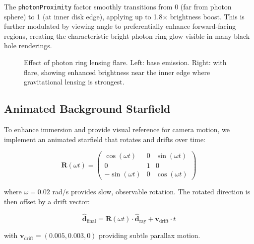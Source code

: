 \documentclass[12pt,a4paper]{article}
\theoremstyle{definition}
\theoremstyle{remark}
\begin{document}
The \texttt{photonProximity} factor smoothly transitions from 0 (far from photon sphere) to 1 (at inner disk edge), applying up to 1.8× brightness boost. This is further modulated by viewing angle to preferentially enhance forward-facing regions, creating the characteristic bright photon ring glow visible in many black hole renderings.

\begin{figure}[H]
    \centering
    \caption{Effect of photon ring lensing flare. Left: base emission. Right: with flare, showing enhanced brightness near the inner edge where gravitational lensing is strongest.}
    \label{fig:lensing_flare}
\end{figure}

\subsection{Animated Background Starfield}

To enhance immersion and provide visual reference for camera motion, we implement an animated starfield that rotates and drifts over time:

\begin{equation}
    \mathbf{R}(\omega t) = \begin{pmatrix}
        \cos(\omega t) & 0 & \sin(\omega t) \\
        0 & 1 & 0 \\
        -\sin(\omega t) & 0 & \cos(\omega t)
    \end{pmatrix}
\end{equation}

where $\omega = 0.02$ rad/s provides slow, observable rotation. The rotated direction is then offset by a drift vector:

\begin{equation}
    \hat{\mathbf{d}}_{\text{final}} = \mathbf{R}(\omega t) \cdot \hat{\mathbf{d}}_{\text{ray}} + \mathbf{v}_{\text{drift}} \cdot t
\end{equation}

with $\mathbf{v}_{\text{drift}} = (0.005, 0.003, 0)$ providing subtle parallax motion.
\end{document}
